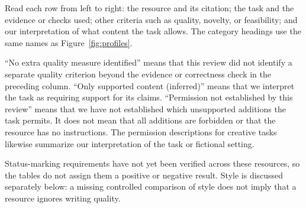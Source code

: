 \documentclass{clv2025}
\begin{document}
Read each row from left to right: the resource and its citation; the task
and the evidence or checks used; other criteria such as quality, novelty,
or feasibility; and our interpretation of what content the task allows.
The category headings use the same names as Figure~\ref{fig:profiles}.

``No extra quality measure identified'' means that this review did not
identify a separate quality criterion beyond the evidence or correctness
check in the preceding column. ``Only supported content (inferred)'' means
that we interpret the task as requiring support for its claims.
``Permission not established by this review'' means that we have not
established which unsupported additions the task permits. It does not
mean that all additions are forbidden or that the resource has no instructions.
The permission descriptions for creative tasks likewise summarize our
interpretation of the task or fictional setting.

Status-marking requirements have not yet been verified across these
resources, so the tables do not assign them a positive or negative result.
Style is discussed separately below: a missing controlled comparison of
style does not imply that a resource ignores writing quality.
\end{document}
